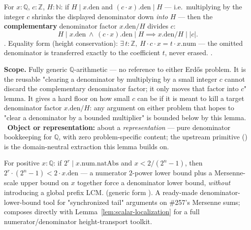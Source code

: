 \begin{lem}
\label{lem:scalar-localization}
For $x:\mathbb Q$, $c:\mathbb Z$, $H:\mathbb N$: if $H\mid x.\mathrm{den}$ and
$(c\cdot x).\mathrm{den}\mid H$ — i.e.\ multiplying by the integer $c$ shrinks the displayed
denominator down \emph{into} $H$ — then the \textbf{complementary} denominator factor
$x.\mathrm{den}/H$ divides $c$:
\[
  H\mid x.\mathrm{den} \ \land\ (c\cdot x).\mathrm{den}\mid H \implies x.\mathrm{den}/H \mid |c|.
\]
.
Equality form (height conservation): $\exists\,t:\mathbb Z,\ H\cdot c\cdot x = t\cdot x.\mathrm{num}$
— the omitted denominator is transferred exactly to the coefficient $t$, never erased.
.

\textbf{Scope.} Fully generic $\mathbb Q$-arithmetic — no reference to either Erdős problem. It is
the reusable "clearing a denominator by multiplying by a small integer $c$ cannot discard the
complementary denominator factor; it only moves that factor into $c$" lemma. It gives a hard floor
on how small $c$ can be if it is meant to kill a target denominator factor $x.\mathrm{den}/H$: any
argument on either problem that hopes to "clear a denominator by a bounded multiplier" is bounded
below by this lemma.
\ \textbf{Object or representation:} about a
\emph{representation} — pure denominator bookkeeping for $\mathbb Q$, with zero problem-specific
content; the upstream primitive
()
is the domain-neutral extraction this lemma builds on.
\end{lem}

\begin{cor}
\label{cor:mersenne-height}
For positive $x:\mathbb Q$: if $2^r\mid x.\mathrm{num}.\mathrm{natAbs}$ and $x < 2/(2^n-1)$, then
$2^r\cdot(2^n-1) < 2\cdot x.\mathrm{den}$ — a numerator $2$-power lower bound plus a Mersenne-scale
upper bound on $x$ together force a denominator lower bound, \emph{without} introducing a global
prefix LCM.
(generic form
).
A ready-made denominator-lower-bound tool for "synchronized tail" arguments on \#257's Mersenne
sums; composes directly with Lemma~\ref{lem:scalar-localization} for a full numerator/denominator
height-transport toolkit.
\ 
\end{cor}

